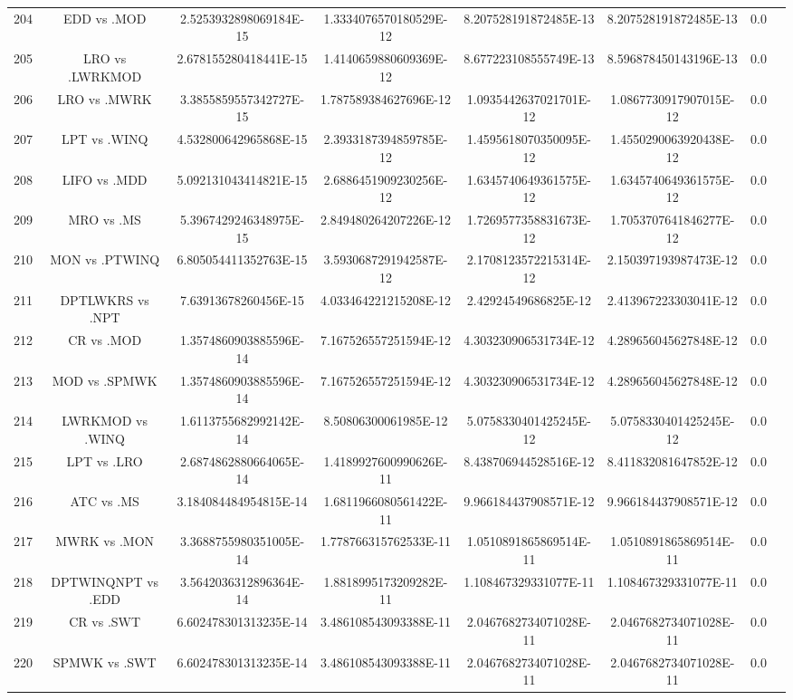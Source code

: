 \documentclass[a3paper,10pt]{article}
\begin{document}
\begin{table}[!htp]
\begin{tabular}{cccccccc}
204&EDD vs .MOD&2.5253932898069184E-15&1.3334076570180529E-12&8.207528191872485E-13&8.207528191872485E-13&0.0\\
205&LRO vs .LWRKMOD&2.678155280418441E-15&1.4140659880609369E-12&8.677223108555749E-13&8.596878450143196E-13&0.0\\
206&LRO vs .MWRK&3.3855859557342727E-15&1.787589384627696E-12&1.0935442637021701E-12&1.0867730917907015E-12&0.0\\
207&LPT vs .WINQ&4.532800642965868E-15&2.3933187394859785E-12&1.4595618070350095E-12&1.4550290063920438E-12&0.0\\
208&LIFO vs .MDD&5.092131043414821E-15&2.6886451909230256E-12&1.6345740649361575E-12&1.6345740649361575E-12&0.0\\
209&MRO vs .MS&5.3967429246348975E-15&2.849480264207226E-12&1.7269577358831673E-12&1.7053707641846277E-12&0.0\\
210&MON vs .PTWINQ&6.805054411352763E-15&3.5930687291942587E-12&2.1708123572215314E-12&2.150397193987473E-12&0.0\\
211&DPTLWKRS vs .NPT&7.63913678260456E-15&4.033464221215208E-12&2.42924549686825E-12&2.413967223303041E-12&0.0\\
212&CR vs .MOD&1.3574860903885596E-14&7.167526557251594E-12&4.303230906531734E-12&4.289656045627848E-12&0.0\\
213&MOD vs .SPMWK&1.3574860903885596E-14&7.167526557251594E-12&4.303230906531734E-12&4.289656045627848E-12&0.0\\
214&LWRKMOD vs .WINQ&1.6113755682992142E-14&8.50806300061985E-12&5.0758330401425245E-12&5.0758330401425245E-12&0.0\\
215&LPT vs .LRO&2.6874862880664065E-14&1.4189927600990626E-11&8.438706944528516E-12&8.411832081647852E-12&0.0\\
216&ATC vs .MS&3.184084484954815E-14&1.6811966080561422E-11&9.966184437908571E-12&9.966184437908571E-12&0.0\\
217&MWRK vs .MON&3.3688755980351005E-14&1.778766315762533E-11&1.0510891865869514E-11&1.0510891865869514E-11&0.0\\
218&DPTWINQNPT vs .EDD&3.5642036312896364E-14&1.8818995173209282E-11&1.108467329331077E-11&1.108467329331077E-11&0.0\\
219&CR vs .SWT&6.602478301313235E-14&3.486108543093388E-11&2.0467682734071028E-11&2.0467682734071028E-11&0.0\\
220&SPMWK vs .SWT&6.602478301313235E-14&3.486108543093388E-11&2.0467682734071028E-11&2.0467682734071028E-11&0.0\\

\end{tabular}
\end{table}
\end{document}
